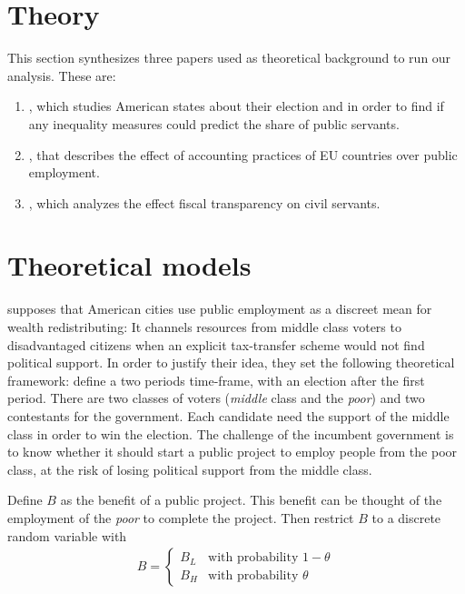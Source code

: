 \section{Theory}\label{Theory}

This section synthesizes three papers used as theoretical background to run our
analysis. These are:

\begin{enumerate}
\item \cite{alesina2000redistributive}, which studies American states about
  their election and in order to find if any inequality measures could predict
  the share of public servants.
\item \cite{alt2014isn}, that describes the effect of accounting practices of
  EU countries over public employment.
\item \cite{aaskoven2015fiscal}, which analyzes the effect fiscal transparency
  on civil servants.
\end{enumerate}

\section{Theoretical models}

\cite{alesina2000redistributive} supposes that American cities use public
employment as a discreet mean for wealth redistributing: It channels resources
from middle class voters to disadvantaged citizens when an explicit
tax-transfer scheme would not find political support. In order to justify their
idea, they set the following theoretical framework: define a two periods
time-frame, with an election after the first period. There are two classes of
voters (\emph{middle} class and the \emph{poor}) and two contestants for the
government. Each candidate need the support of the middle class in order to win
the election. The challenge of the incumbent government is to know whether it
should start a public project to employ people from the poor class, at the risk
of losing political support from the middle class.

Define \(B\) as the benefit of a public project. This benefit can be thought of
the employment of the \emph{poor} to complete the project. Then restrict $B$ to
a discrete random variable with
\begin{align*}
  B =
  \left\{
    \begin{array}{ll}
    B_L & \mbox{with probability } 1-\theta \\
    B_H & \mbox{with probability } \theta
    \end{array}
  \right.
\end{align*}

